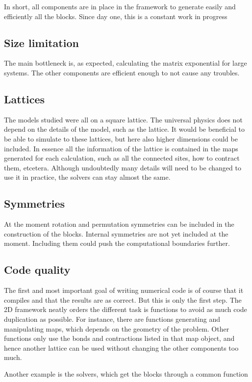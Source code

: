 
In short, all components are in place in the framework to generate easily and efficiently all the blocks. Since day one, this is a constant work in progress

\subsection{Size limitation}
The main bottleneck is, as expected, calculating the matrix exponential for large systems. The other components are efficient enough to not cause any troubles.

\subsection{Lattices}
The models studied were all on a square lattice. The universal physics does not depend on the details of the model, such as the lattice. It would be beneficial to be able to simulate to these lattices, but here also higher dimensions could be included. In essence all the information of the lattice is contained in the maps generated for each calculation, such as all the connected sites, how to contract them, etcetera. Although undoubtedly many details will need to be changed to use it in practice, the solvers can stay almost the same.

\subsection{Symmetries}

At the moment rotation and permutation symmetries can be included in the construction of the blocks. Internal symmetries are not yet included at the moment. Including them could push the computational boundaries further.

\subsection{Code quality}
The first and most important goal of writing numerical code is of course that it compiles and that the results are as correct. But this is only the first step. The 2D framework neatly orders the different task is functions to avoid as much code duplication as possible. For instance, there are functions generating and manipulating maps, which depends on the geometry of the problem. Other functions only use the bonds and contractions listed in that map object, and hence another lattice can be used without changing the other components too much.

Another example is the solvers, which get the blocks through a common function

